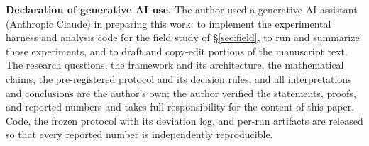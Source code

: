 \documentclass[11pt]{article}
\theoremstyle{remark}
\begin{document}
\vspace{0.5em}
\noindent\textbf{\small Declaration of generative AI use.}
{\small The author used a generative AI assistant (Anthropic Claude) in
preparing this work: to implement the experimental harness and analysis code
for the field study of \S\ref{sec:field}, to run and summarize those
experiments, and to draft and copy-edit portions of the manuscript text. The
research questions, the framework and its architecture, the mathematical
claims, the pre-registered protocol and its decision rules, and all
interpretations and conclusions are the author's own; the author verified the
statements, proofs, and reported numbers and takes full responsibility for
the content of this paper. Code, the frozen protocol with its deviation log,
and per-run artifacts are released so that every reported number is
independently reproducible.}
\vspace{0.5em}












\end{document}
